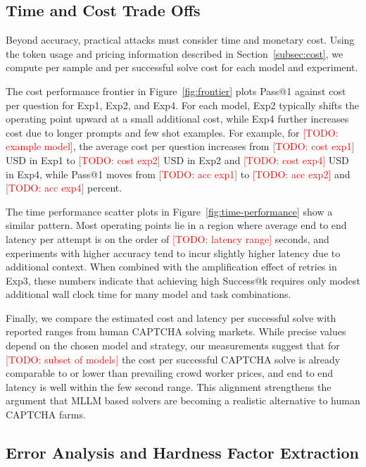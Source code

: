 \documentclass[sigconf, review]{acmart}
\begin{document}
\subsection{Time and Cost Trade Offs}

Beyond accuracy, practical attacks must consider time and monetary cost. Using the token usage and pricing information described in Section~\ref{subsec:cost}, we compute per sample and per successful solve cost for each model and experiment.

The cost performance frontier in Figure~\ref{fig:frontier} plots Pass@1 against cost per question for Exp1, Exp2, and Exp4. For each model, Exp2 typically shifts the operating point upward at a small additional cost, while Exp4 further increases cost due to longer prompts and few shot examples. For example, for \textcolor{red}{[TODO: example model]}, the average cost per question increases from \textcolor{red}{[TODO: cost exp1]} USD in Exp1 to \textcolor{red}{[TODO: cost exp2]} USD in Exp2 and \textcolor{red}{[TODO: cost exp4]} USD in Exp4, while Pass@1 moves from \textcolor{red}{[TODO: acc exp1]} to \textcolor{red}{[TODO: acc exp2]} and \textcolor{red}{[TODO: acc exp4]} percent.

The time performance scatter plots in Figure~\ref{fig:time-performance} show a similar pattern. Most operating points lie in a region where average end to end latency per attempt is on the order of \textcolor{red}{[TODO: latency range]} seconds, and experiments with higher accuracy tend to incur slightly higher latency due to additional context. When combined with the amplification effect of retries in Exp3, these numbers indicate that achieving high Success@k requires only modest additional wall clock time for many model and task combinations.

Finally, we compare the estimated cost and latency per successful solve with reported ranges from human CAPTCHA solving markets. While precise values depend on the chosen model and strategy, our measurements suggest that for \textcolor{red}{[TODO: subset of models]} the cost per successful CAPTCHA solve is already comparable to or lower than prevailing crowd worker prices, and end to end latency is well within the few second range. This alignment strengthens the argument that MLLM based solvers are becoming a realistic alternative to human CAPTCHA farms.

\subsection{Error Analysis and Hardness Factor Extraction}
\end{document}
